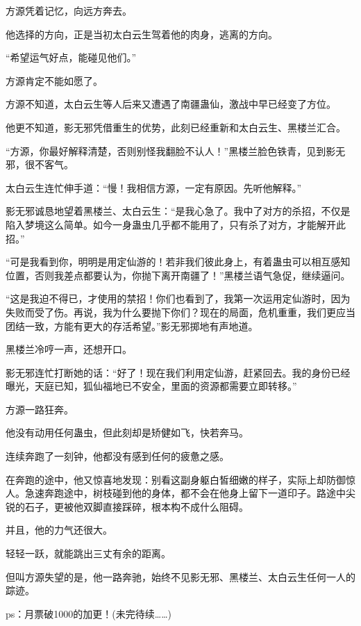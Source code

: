 \begin{this_body}
方源凭着记忆，向远方奔去。

他选择的方向，正是当初太白云生驾着他的肉身，逃离的方向。

“希望运气好点，能碰见他们。”

方源肯定不能如愿了。

方源不知道，太白云生等人后来又遭遇了南疆蛊仙，激战中早已经变了方位。

他更不知道，影无邪凭借重生的优势，此刻已经重新和太白云生、黑楼兰汇合。

“方源，你最好解释清楚，否则别怪我翻脸不认人！”黑楼兰脸色铁青，见到影无邪，很不客气。

太白云生连忙伸手道：“慢！我相信方源，一定有原因。先听他解释。”

影无邪诚恳地望着黑楼兰、太白云生：“是我心急了。我中了对方的杀招，不仅是陷入梦境这么简单。如今一身蛊虫几乎都不能用了，只有杀了对方，才能解开此招。”

“可是我看到你，明明是用定仙游的！若非我们彼此身上，有着蛊虫可以相互感知位置，否则我差点都要认为，你抛下离开南疆了！”黑楼兰语气急促，继续逼问。

“这是我迫不得已，才使用的禁招！你们也看到了，我第一次运用定仙游时，因为失败而受了伤。再说，我为什么要抛下你们？现在的局面，危机重重，我们更应当团结一致，方能有更大的存活希望。”影无邪掷地有声地道。

黑楼兰冷哼一声，还想开口。

影无邪连忙打断她的话：“好了！现在我们利用定仙游，赶紧回去。我的身份已经曝光，天庭已知，狐仙福地已不安全，里面的资源都需要立即转移。”

方源一路狂奔。

他没有动用任何蛊虫，但此刻却是矫健如飞，快若奔马。

连续奔跑了一刻钟，他都没有感到任何的疲惫之感。

在奔跑的途中，他又惊喜地发现：别看这副身躯白皙细嫩的样子，实际上却防御惊人。急速奔跑途中，树枝碰到他的身体，都不会在他身上留下一道印子。路途中尖锐的石子，更被他双脚直接踩碎，根本构不成什么阻碍。

并且，他的力气还很大。

轻轻一跃，就能跳出三丈有余的距离。

但叫方源失望的是，他一路奔驰，始终不见影无邪、黑楼兰、太白云生任何一人的踪迹。

ps：月票破1000的加更！(未完待续……)

\end{this_body}

